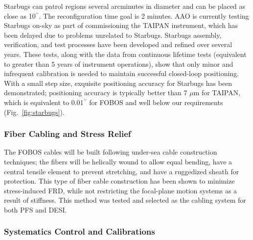 \documentclass[oneside,11pt]{amsart}
\newcommand{\arcsec}{\mbox{$^{\prime\prime}$}}
\begin{document}
Starbugs can patrol regions several arcminutes in diameter and can be placed as close as 10\arcsec{}. The reconfiguration time goal is 2 minutes. AAO is currently testing Starbugs on-sky as part of commissioning the TAIPAN instrument, which has been delayed due to problems unrelated to Starbugs. 
Starbugs assembly, verification, and test processes have been developed and refined over several years. These tests, along with the data from continuous lifetime tests (equivalent to greater than 5 years of instrument operations), show that only minor and infrequent calibration is needed to maintain successful closed-loop positioning. With a small step size, exquisite positioning accuracy for Starbugs has been demonstrated; positioning accuracy is typically better than 7 $\mu$m for TAIPAN, which is equivalent to 0.01\arcsec{} for FOBOS and well below our requirements  (Fig.~\ref{fig:starbugs}). 

\subsubsection{Fiber Cabling and Stress Relief}

The FOBOS cables will be built following under-sea cable construction techniques; the fibers will be helically wound to allow equal bending, have a central tensile element to prevent stretching, and have a ruggedized sheath for protection. This type of fiber cable construction has been shown to minimize stress-induced FRD, while not restricting the focal-plane motion systems as a result of stiffness.  This method was tested and selected as the cabling system for both PFS and DESI.

\subsubsection{Systematics Control and Calibrations}
\label{sec:calib}
\end{document}
